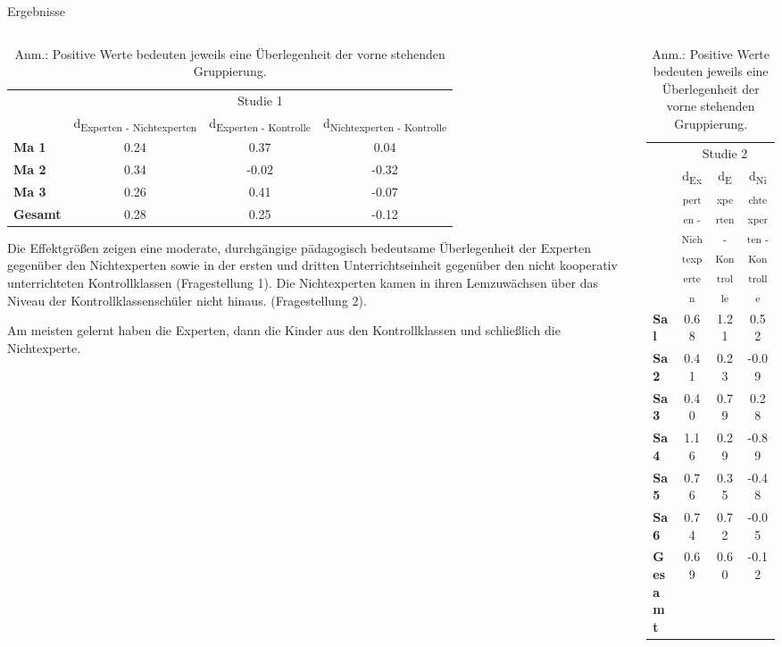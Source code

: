 \begin{block}{Ergebnisse} %
\begin{columns}[t,totalwidth=\twocolwid] %

\begin{column}{\onecolwid}
\begin{table}
\begin{tabular}{lccc}
 & \multicolumn{3}{c}{Studie 1} \\
\cmidrule{2-4}
 & d\textsubscript{Experten - Nichtexperten} & d\textsubscript{Experten - Kontrolle} & d\textsubscript{Nichtexperten - Kontrolle} \\
\midrule 
\textbf{Ma 1} & 0.24 & 0.37 & 0.04 \\
\textbf{Ma 2} & 0.34 & -0.02 & -0.32 \\
\textbf{Ma 3} & 0.26 & 0.41 & -0.07 \\
\midrule 
\textbf{Gesamt} & 0.28 & 0.25 & -0.12 \\
\bottomrule
\end{tabular}
{\caption*{Anm.: Positive Werte bedeuten jeweils eine Überlegenheit der vorne stehenden Gruppierung.}}
\end{table}

\justifying
Die Effektgrößen zeigen eine moderate, durchgängige pädagogisch bedeutsame Überlegenheit der Experten gegenüber den Nichtexperten sowie in der ersten und dritten Unterrichtseinheit gegenüber den nicht kooperativ unterrichteten Kontrollklassen (Fragestellung 1). Die Nichtexperten kamen in ihren Lemzuwächsen über das Niveau der Kontrollklassenschüler nicht hinaus. (Fragestellung 2). 

Am meisten gelernt haben die Experten, dann die Kinder aus den Kontrollklassen und schließlich die Nichtexperte.

\end{column}

\begin{column}{\onecolwid}
\begin{table}
\begin{tabular}{lccc}
 & \multicolumn{3}{c}{Studie 2} \\
\cmidrule{2-4}
 & d\textsubscript{Experten - Nichtexperten} & d\textsubscript{Experten - Kontrolle} & d\textsubscript{Nichtexperten - Kontrolle} \\
\midrule 
\textbf{Sa l} & 0.68 & 1.21 & 0.52 \\
\textbf{Sa 2} & 0.41 & 0.23 & -0.09 \\
\textbf{Sa 3} & 0.40 & 0.79 & 0.28 \\
\textbf{Sa 4} & 1.16 & 0.29 & -0.89 \\
\textbf{Sa 5} & 0.76 & 0.35 & -0.48 \\
\textbf{Sa 6} & 0.74 & 0.72 & -0.05 \\
\midrule 
\textbf{Gesamt} & 0.69 & 0.60 & -0.12 \\
\bottomrule
\end{tabular}
{\caption*{Anm.: Positive Werte bedeuten jeweils eine Überlegenheit der vorne stehenden Gruppierung.}}
\end{table}


\end{column}
\end{columns}
\end{block}
